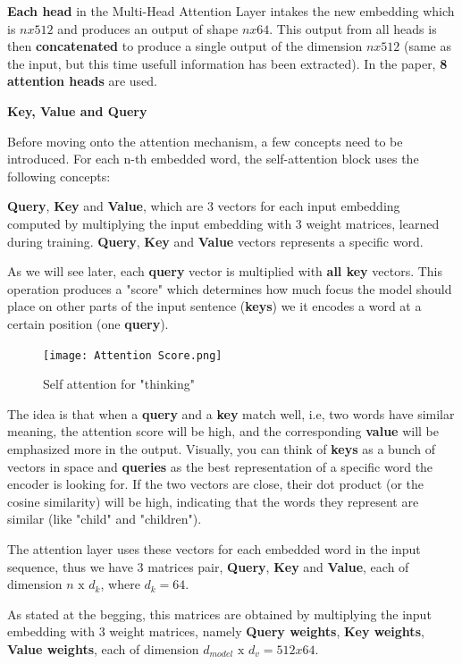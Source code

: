 \textbf{Each head} in the Multi-Head Attention Layer intakes the new embedding  which is $n x 512$ and produces an output of shape $n x 64$. This output from all heads is then \textbf{concatenated} to produce a single output of the dimension $n x 512$ (same as the input, but this time usefull information has been extracted). In the paper, \textbf{8 attention heads} are used.

\textbf{Key, Value and Query}

Before moving onto the attention mechanism, a few concepts need to be introduced. For each n-th embedded word, the self-attention block uses the following concepts:

\textbf{Query}, \textbf{Key} and \textbf{Value}, which are 3 vectors for each input embedding computed by multiplying the input embedding with 3 weight matrices, learned during training.  \textbf{Query}, \textbf{Key} and \textbf{Value} vectors represents a specific word.

As we will see later, each \textbf{query} vector is multiplied with \textbf{all key} vectors. This operation produces a  "score" which determines how much focus the model should place on other parts of the input sentence (\textbf{keys})  we it encodes a word at a certain position (one \textbf{query}).

\begin{figure}[H]
    \centering
    \texttt{[image: Attention Score.png]}
    \caption{Self attention for "thinking"}
    \label{fig:self attention}
\end{figure}


The idea is that when a \textbf{query} and a \textbf{key} match well, i.e, two words have similar meaning, the attention score will be high, and the corresponding \textbf{value} will be emphasized more in the output. Visually, you can think of \textbf{keys} as a bunch of vectors in space and \textbf{queries} as the best representation of a specific word the encoder is looking for. If the two vectors are close, their dot product (or the cosine similarity) will be high, indicating that the words they represent are similar (like "child" and "children").


The attention layer uses these vectors for each embedded word in the input sequence, thus we have 3 matrices pair, \textbf{Query}, \textbf{Key} and \textbf{Value}, each of dimension $n \text{ x } d_k$, where $d_k = 64$.

As stated at the begging, this matrices are obtained by multiplying the input embedding with 3 weight matrices, namely \textbf{Query weights}, \textbf{Key weights}, \textbf{Value weights}, each of dimension $d_{model} \text{ x } d_v = 512x64$.
    


